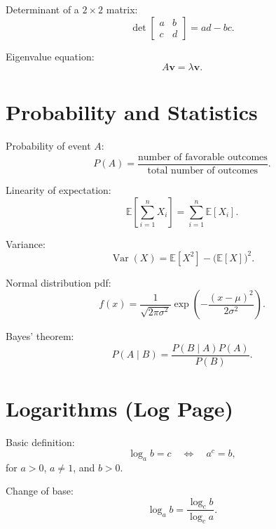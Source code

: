 \documentclass[12pt,a4paper]{article}
\begin{document}
Determinant of a $2 \times 2$ matrix:
\begin{equation}
  \det
  \begin{bmatrix}
    a & b \\
    c & d
  \end{bmatrix}
  = ad - bc.
\end{equation}

Eigenvalue equation:
\begin{equation}
  A \mathbf{v} = \lambda \mathbf{v}.
\end{equation}

\section{Probability and Statistics}

Probability of event $A$:
\begin{equation}
  P(A) = \frac{\text{number of favorable outcomes}}{\text{total number of outcomes}}.
\end{equation}

Linearity of expectation:
\begin{equation}
  \mathbb{E}\left[\sum_{i=1}^{n} X_i\right]
  = \sum_{i=1}^{n} \mathbb{E}[X_i].
\end{equation}

Variance:
\begin{equation}
  \operatorname{Var}(X) = \mathbb{E}[X^2] - \big(\mathbb{E}[X]\big)^2.
\end{equation}

Normal distribution pdf:
\begin{equation}
  f(x) = \frac{1}{\sqrt{2\pi \sigma^2}}
  \exp\left( -\frac{(x - \mu)^2}{2\sigma^2} \right).
\end{equation}

Bayes' theorem:
\begin{equation}
  P(A \mid B) = \frac{P(B \mid A) P(A)}{P(B)}.
\end{equation}

\clearpage
\section{Logarithms (Log Page)}

Basic definition:
\begin{equation}
  \log_a b = c \quad \Longleftrightarrow \quad a^c = b,
\end{equation}
for $a > 0$, $a \neq 1$, and $b > 0$.

Change of base:
\begin{equation}
  \log_a b = \frac{\log_c b}{\log_c a}.
\end{equation}
\end{document}

